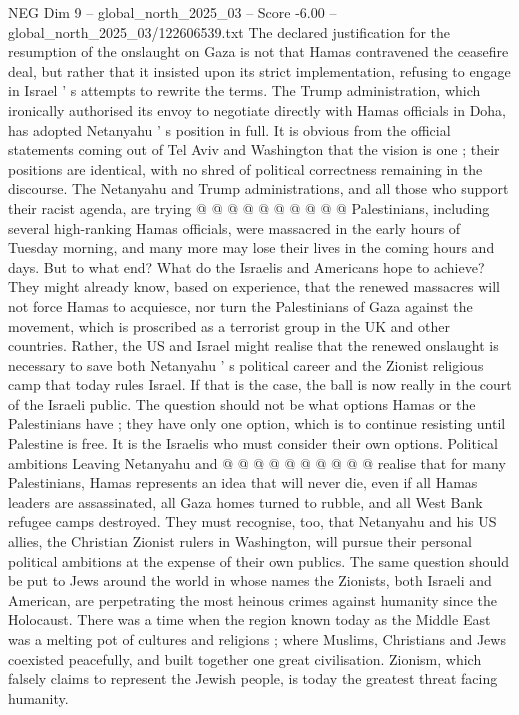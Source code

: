 \begin{textsample}{NEG Dim 9 – global\_north\_2025\_03 – Score -6.00 – global\_north\_2025\_03/122606539.txt}
The declared justification for the resumption of the onslaught on Gaza is not that Hamas contravened the ceasefire deal, but rather that it insisted upon its strict implementation, refusing to engage in Israel ' s attempts to rewrite the terms.
The Trump administration, which ironically authorised its envoy to negotiate directly with Hamas officials in Doha, has adopted Netanyahu ' s position in full.
It is obvious from the official statements coming out of Tel Aviv and Washington that the vision is one ; their positions are identical, with no shred of political correctness remaining in the discourse.
The Netanyahu and Trump administrations, and all those who support their racist agenda, are trying @ @ @ @ @ @ @ @ @ @ Palestinians, including several high-ranking Hamas officials, were massacred in the early hours of Tuesday morning, and many more may lose their lives in the coming hours and days.
But to what end?
What do the Israelis and Americans hope to achieve?
They might already know, based on experience, that the renewed massacres will not force Hamas to acquiesce, nor turn the Palestinians of Gaza against the movement, which is proscribed as a terrorist group in the UK and other countries.
Rather, the US and Israel might realise that the renewed onslaught is necessary to save both Netanyahu ' s political career and the Zionist religious camp that today rules Israel.
If that is the case, the ball is now really in the court of the Israeli public.
The question should not be what options Hamas or the Palestinians have ; they have only one option, which is to continue resisting until Palestine is free.
It is the Israelis who must consider their own options.
Political ambitions Leaving Netanyahu and @ @ @ @ @ @ @ @ @ @ realise that for many Palestinians, Hamas represents an idea that will never die, even if all Hamas leaders are assassinated, all Gaza homes turned to rubble, and all West Bank refugee camps destroyed.
They must recognise, too, that Netanyahu and his US allies, the Christian Zionist rulers in Washington, will pursue their personal political ambitions at the expense of their own publics.
The same question should be put to Jews around the world in whose names the Zionists, both Israeli and American, are perpetrating the most heinous crimes against humanity since the Holocaust.
There was a time when the region known today as the Middle East was a melting pot of cultures and religions ; where Muslims, Christians and Jews coexisted peacefully, and built together one great civilisation.
Zionism, which falsely claims to represent the Jewish people, is today the greatest threat facing humanity.

\end{textsample}
